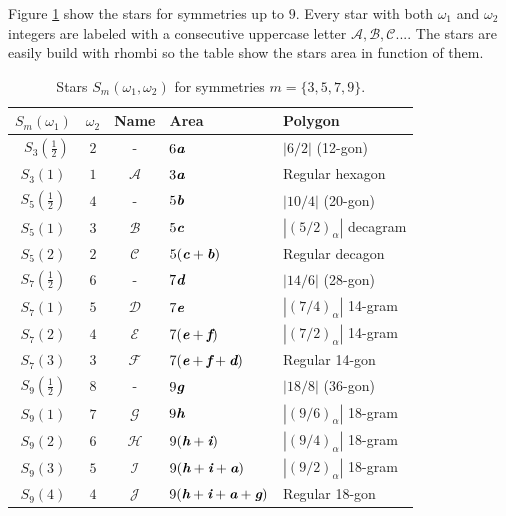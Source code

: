 \documentclass[11pt]{article}
\def\mathbi#1{\textbf{\em #1}}
\begin{document}
Figure \ref{tbl:stars} show the stars for symmetries up to $9$. Every star with both $\omega_1$ and $\omega_2$ integers are labeled with a consecutive uppercase letter $\mathcal{A}, \mathcal{B}, \mathcal{C}...$. The stars are easily build with rhombi so the table show the stars area in function of them.

\begin{table}[H]
\begin{center}
\begin{tabular}{|c|c|c|l|l|}
\hline
$S_m(\omega_1)$ & $\omega_2$ & Name & Area & Polygon \\ \hline\
$S_3(\frac{1}2)$ & $2$ & -     & $6\mathbi{a}$ & $|6/2|$ (12-gon) \\[0.5ex]
$S_3(1)$         & $1$ & $\mathcal{A}$ & $3\mathbi{a}$ & Regular hexagon \\[0.5ex]
\hline
$S_5(\frac{1}2)$ & $4$ & -      & $5\mathbi{b}$ & $|10/4|$ (20-gon)\\[0.5ex]
$S_5(1)$ & $3$ & $\mathcal{B}$ & $5\mathbi{c}$ & $|(5/2)_\alpha|$ decagram\\[0.5ex]
$S_5(2)$ & $2$ & $\mathcal{C}$ & $5(\mathbi{c}+\mathbi{b})$ & Regular decagon\\[0.5ex]
\hline
$S_7(\frac{1}2)$ & $6$ & -     & $7\mathbi{d}$ & $|14/6|$ (28-gon)\\[0.5ex]
$S_7(1)$ & $5$ & $\mathcal{D}$ & $7\mathbi{e}$ & $|(7/4)_\alpha|$ 14-gram\\[0.5ex]
$S_7(2)$ & $4$ & $\mathcal{E}$ & $7(\mathbi{e}+\mathbi{f})$ & $|(7/2)_\alpha|$ 14-gram\\[0.5ex]
$S_7(3)$ & $3$ & $\mathcal{F}$ & $7(\mathbi{e}+\mathbi{f}+\mathbi{d})$ & Regular 14-gon\\[0.5ex]
\hline
$S_9(\frac{1}2)$ & $8$ & -     & $9\mathbi{g}$ & $|18/8|$ (36-gon)\\[0.5ex]
$S_9(1)$ & $7$ & $\mathcal{G}$ & $9\mathbi{h}$ & $|(9/6)_\alpha|$ 18-gram\\[0.5ex]
$S_9(2)$ & $6$ & $\mathcal{H}$ & $9(\mathbi{h}+\mathbi{i})$ & $|(9/4)_\alpha|$ 18-gram\\[0.5ex]
$S_9(3)$ & $5$ & $\mathcal{I}$ & $9(\mathbi{h}+\mathbi{i}+\mathbi{a})$ & $|(9/2)_\alpha|$ 18-gram\\[0.5ex]
$S_9(4)$ & $4$ & $\mathcal{J}$ & $9(\mathbi{h}+\mathbi{i}+\mathbi{a}+\mathbi{g})$ & Regular 18-gon\\[0.5ex]
\hline
\end{tabular}
\caption{Stars $S_m(\omega_1,\omega_2)$ for symmetries $m=\{3,5,7,9\}$.}
\label{tbl:stars}
\end{center}
\end{table}
\end{document}
